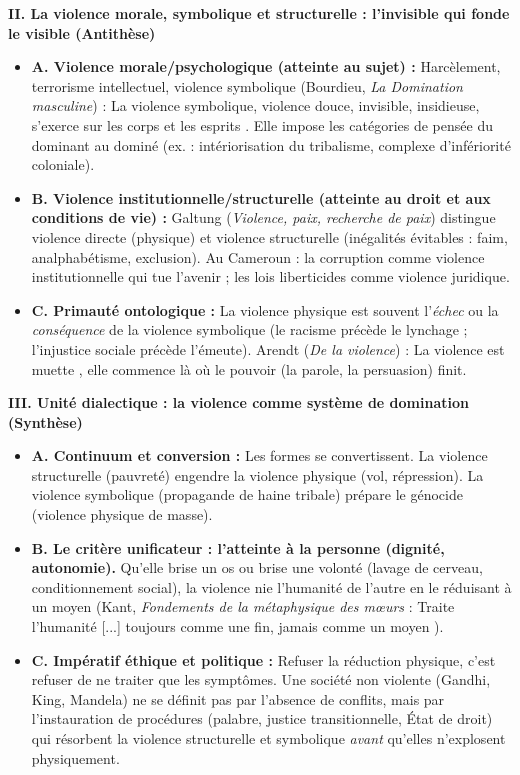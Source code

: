 \documentclass[11pt]{article}
\newcommand{\cle}[1]{{\popxbold\color{popdark}#1}}
\begin{document}
\begin{exoresolu}
\textbf{II. La violence morale, symbolique et structurelle : l'invisible qui fonde le visible (Antithèse)}
\begin{itemize}
    \item \textbf{A. Violence morale/psychologique (atteinte au sujet) :} Harcèlement, terrorisme intellectuel, \cle{violence symbolique} (Bourdieu, \emph{La Domination masculine}) : \guillemotleft La violence symbolique, violence douce, invisible, insidieuse, s'exerce sur les corps et les esprits \guillemotright. Elle impose les catégories de pensée du dominant au dominé (ex. : intériorisation du tribalisme, complexe d'infériorité coloniale).
    \item \textbf{B. Violence institutionnelle/structurelle (atteinte au droit et aux conditions de vie) :} Galtung (\emph{Violence, paix, recherche de paix}) distingue \cle{violence directe} (physique) et \cle{violence structurelle} (inégalités évitables : faim, analphabétisme, exclusion). Au Cameroun : la corruption comme violence institutionnelle qui tue l'avenir ; les lois liberticides comme violence juridique.
    \item \textbf{C. Primauté ontologique :} La violence physique est souvent l'\emph{échec} ou la \emph{conséquence} de la violence symbolique (le racisme précède le lynchage ; l'injustice sociale précède l'émeute). Arendt (\emph{De la violence}) : \guillemotleft La violence est muette \guillemotright, elle commence là où le pouvoir (la parole, la persuasion) finit.
\end{itemize}

\textbf{III. Unité dialectique : la violence comme système de domination (Synthèse)}
\begin{itemize}
    \item \textbf{A. Continuum et conversion :} Les formes se convertissent. La violence structurelle (pauvreté) engendre la violence physique (vol, répression). La violence symbolique (propagande de haine tribale) prépare le génocide (violence physique de masse).
    \item \textbf{B. Le critère unificateur : l'atteinte à la \cle{personne} (dignité, autonomie).} Qu'elle brise un os ou brise une volonté (lavage de cerveau, conditionnement social), la violence nie l'humanité de l'autre en le réduisant à un \cle{moyen} (Kant, \emph{Fondements de la métaphysique des mœurs} : \guillemotleft Traite l'humanité [...] toujours comme une fin, jamais comme un moyen \guillemotright).
    \item \textbf{C. Impératif éthique et politique :} Refuser la réduction physique, c'est refuser de ne traiter que les symptômes. Une société \cle{non violente} (Gandhi, King, Mandela) ne se définit pas par l'absence de conflits, mais par l'instauration de procédures (palabre, justice transitionnelle, État de droit) qui résorbent la violence structurelle et symbolique \emph{avant} qu'elles n'explosent physiquement.
\end{itemize}


\end{exoresolu}
\end{document}

